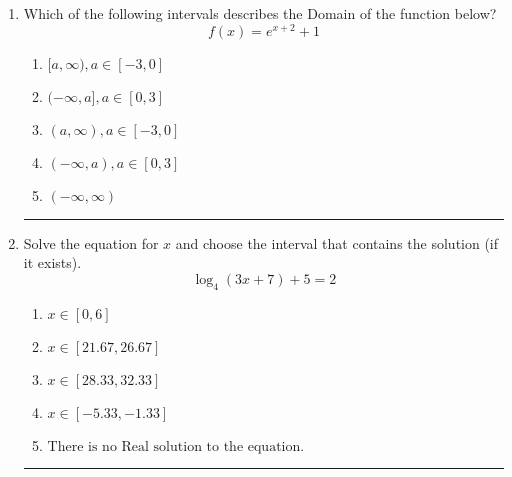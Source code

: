 \documentclass[14pt]{extbook}
\newcommand{\litem}[1]{\item#1\hspace*{-1cm}\rule{\textwidth}{0.4pt}}
\begin{document}
\begin{enumerate}
{\begin{enumerate}[label=\Alph*.]
\end{enumerate} }
\litem{
Which of the following intervals describes the Domain of the function below?\[ f(x) = e^{x+2}+1 \]\begin{enumerate}[label=\Alph*.]
\item \( [a, \infty), a \in [-3, 0] \)
\item \( (-\infty, a], a \in [0, 3] \)
\item \( (a, \infty), a \in [-3, 0] \)
\item \( (-\infty, a), a \in [0, 3] \)
\item \( (-\infty, \infty) \)

\end{enumerate} }
\litem{
Solve the equation for $x$ and choose the interval that contains the solution (if it exists).\[ \log_{4}{(3x+7)}+5 = 2 \]\begin{enumerate}[label=\Alph*.]
\item \( x \in [0, 6] \)
\item \( x \in [21.67, 26.67] \)
\item \( x \in [28.33, 32.33] \)
\item \( x \in [-5.33, -1.33] \)
\item \( \text{There is no Real solution to the equation.} \)

\end{enumerate} }
\end{enumerate}
\end{document}

